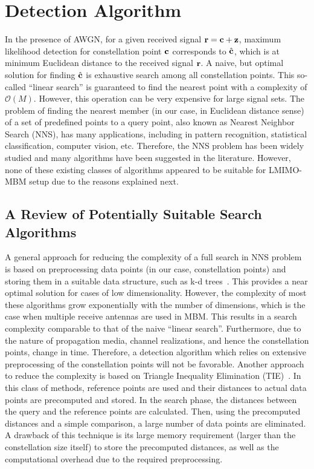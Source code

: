 \section {Detection Algorithm}
\label{sec: Detection Algorithm}

In the presence of AWGN, for a given received signal $\mathbf{r} = \mathbf{c} + \mathbf{z} $, maximum likelihood detection for constellation point $ \mathbf{c}$ corresponds to $\hat{\mathbf{ c } }$, which is at minimum Euclidean distance to the received signal $\mathbf{r}$. A naive, but optimal solution for finding $\hat {\mathbf{c}}$ is exhaustive search among all constellation points. This so-called ``linear search'' is guaranteed to find the nearest point with a complexity of $\mathcal{O}(M)$. However, this operation can be very expensive for large signal sets. The problem of finding the nearest member (in our case, in Euclidean distance sense) of a set of predefined points to a query point, also known as Nearest Neighbor Search (NNS), has many applications, including in pattern recognition, statistical classification, computer vision, etc. Therefore, the NNS problem has been widely studied and many algorithms have been suggested in the literature. However, none of these  existing classes of algorithms appeared to be suitable for LMIMO-MBM setup due to the reasons explained next.

\subsection {A Review of Potentially Suitable Search Algorithms}
A general approach for reducing the complexity of a full search in NNS problem is based on preprocessing data points (in our case, constellation points) and storing them in a suitable data structure, such as k-d trees~\cite{kdtree1}. This provides a near optimal solution for cases of low dimensionality. However, the complexity of most these algorithms grow exponentially with the number of dimensions, which is the case when multiple receive antennas are used in MBM. This results in a search complexity comparable to that of the naive ``linear search''.
Furthermore, due to the nature of propagation media, channel realizations, and hence the constellation points, change in time. Therefore, a detection algorithm which relies on extensive preprocessing of the constellation points will not be favorable. Another approach to reduce the complexity is based on Triangle Inequality Elimination (TIE)~\cite{TIE1, TIE2, TIE3, TIE4}. In this class of methods, reference points are used and their distances to actual data points are precomputed and stored. In the search phase, the distances between the query and the reference points are calculated. Then, using the precomputed distances and a simple comparison, a large number of data points are eliminated. A drawback of this technique is its large memory requirement (larger than the constellation size itself) to store the precomputed distances, as well as the computational overhead due to the required preprocessing.

